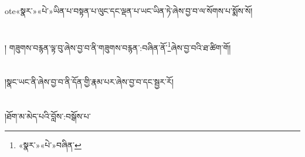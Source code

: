 ote{«སྣར་»«པེ་»ཡིན་པ་}བསྟན་པ་ལུང་དང་ལྡན་པ་ཡང་ཡིན་ཏེ་ཞེས་བྱ་བ་ལ་སོགས་པ་སྨོས་སོ།\chapter{ }།
གཟུགས་བརྙན་ལྟ་བུ་ཞེས་བྱ་བ་ནི་གཟུགས་བརྙན་:བཞིན་ནོ་\footnote{«སྣར་»«པེ་»བཞིན་}ཞེས་བྱ་བའི་ཐ་ཚིག་གོ།\chapter{ }།སྣང་ཡང་ནི་ཞེས་བྱ་བ་ནི་དོན་གྱི་རྣམ་པར་ཞེས་བྱ་བ་དང་སྦྱར་རོ།\chapter{ }།ཐོག་མ་མེད་པའི་བློས་:བསྒོས་པ་